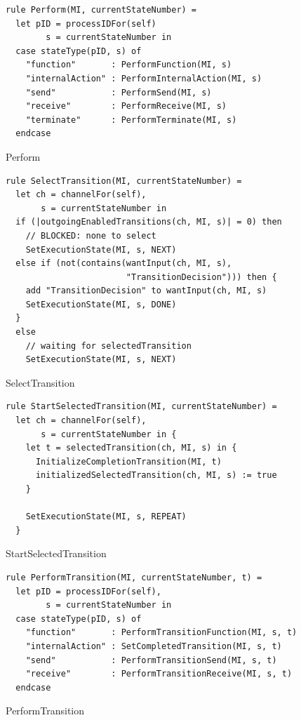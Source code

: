 \begin{listing}[H]
\begin{verbatim}
rule Perform(MI, currentStateNumber) =
  let pID = processIDFor(self)
        s = currentStateNumber in
  case stateType(pID, s) of
    "function"       : PerformFunction(MI, s)
    "internalAction" : PerformInternalAction(MI, s)
    "send"           : PerformSend(MI, s)
    "receive"        : PerformReceive(MI, s)
    "terminate"      : PerformTerminate(MI, s)
  endcase
\end{verbatim}
\caption{Perform}
\label{lst:asm:Perform}
\end{listing}


\begin{listing}[H]
\begin{verbatim}
rule SelectTransition(MI, currentStateNumber) =
  let ch = channelFor(self),
       s = currentStateNumber in
  if (|outgoingEnabledTransitions(ch, MI, s)| = 0) then
    // BLOCKED: none to select
    SetExecutionState(MI, s, NEXT)
  else if (not(contains(wantInput(ch, MI, s),
                        "TransitionDecision"))) then {
    add "TransitionDecision" to wantInput(ch, MI, s)
    SetExecutionState(MI, s, DONE)
  }
  else
    // waiting for selectedTransition
    SetExecutionState(MI, s, NEXT)
\end{verbatim}
\caption{SelectTransition}
\label{lst:asm:SelectTransition}
\end{listing}



\begin{listing}[H]
\begin{verbatim}
rule StartSelectedTransition(MI, currentStateNumber) =
  let ch = channelFor(self),
       s = currentStateNumber in {
    let t = selectedTransition(ch, MI, s) in {
      InitializeCompletionTransition(MI, t)
      initializedSelectedTransition(ch, MI, s) := true
    }

    SetExecutionState(MI, s, REPEAT)
  }
\end{verbatim}
\caption{StartSelectedTransition}
\label{lst:asm:StartSelectedTransition}
\end{listing}




\begin{listing}[H]
\begin{verbatim}
rule PerformTransition(MI, currentStateNumber, t) =
  let pID = processIDFor(self),
        s = currentStateNumber in
  case stateType(pID, s) of
    "function"       : PerformTransitionFunction(MI, s, t)
    "internalAction" : SetCompletedTransition(MI, s, t)
    "send"           : PerformTransitionSend(MI, s, t)
    "receive"        : PerformTransitionReceive(MI, s, t)
  endcase
\end{verbatim}
\caption{PerformTransition}
\label{lst:asm:PerformTransition}
\end{listing}



